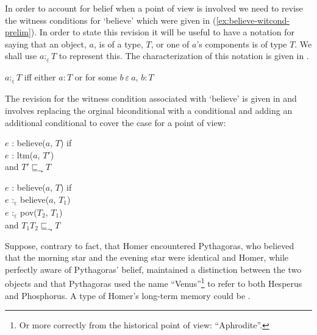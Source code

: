 
In order to account for belief when a point of view is involved we
need to revise the witness conditions for `believe' which were given
in (\ref{ex:believe-witcond-prelim}).  In order to state this revision
it will be useful to have a notation for saying that an object, $a$,
is of a type, $T$, or one of $a$'s components is of type $T$.  We
shall use $a:_{\underline{\varepsilon}}T$ to represent this.  The characterization of
this notation is given in \nexteg{}.
\begin{ex} 
$a:_{\underline{\varepsilon}}T$ iff either $a:T$ or for some $b\
\varepsilon\ a$, $b:T$ 
\end{ex} 
The revision for the witness condition associated with `believe' is given in
\nexteg{} and involves replacing the orginal biconditional with a
conditional and adding an additional conditional to cover the case for
a point of view:
\begin{ex} 
$e$ : believe($a$, $T$) if\\
\hspace*{2em} $e$ : ltm($a$, $T'$) \\
\hspace*{2em} and $T'\sqsubseteq_{\leadsto}T$ 

$e$ : believe($a$, $T$) if\\
\hspace*{2em} $e$ :$_{\underline{\varepsilon}}$ believe($a$, $T_1$)\\
\hspace*{2em} $e$ :$_{\underline{\varepsilon}}$ pov($T_2$, $T_1$)\\
\hspace*{2em} and $T_1$\fbox{\d{$\wedge$}}$T_2 \sqsubseteq_{\leadsto}T$
\end{ex} 
  

Suppose, contrary to fact, that Homer encountered Pythagoras, who
believed that the morning star and the evening star were identical and
Homer, while perfectly aware of Pythagoras' belief, maintained a
distinction between the two objects and that Pythagoras used the name
``Venus''\footnote{Or more correctly from the historical point of
  view: ``Aphrodite''.} to refer to both Hesperus and Phosphorus.  A
type of Homer's long-term memory could be \nexteg{}.



